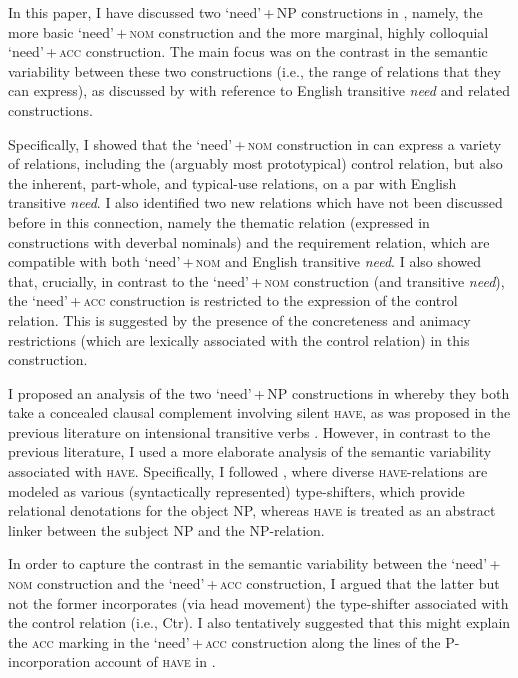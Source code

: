 \documentclass[output=paper]{langscibook}
\begin{document}
In this paper, I have discussed two `need'\,+\,NP constructions in , namely, the more basic `need'\,+\,\textsc{nom} construction and the more marginal, highly colloquial `need'\,+\,\textsc{acc} construction. The main focus was on the contrast in the semantic variability between these two constructions (i.e., the range of relations that they can express), as discussed by \citet{Zaroukian.Beller2013} with reference to English transitive \textit{need} and related constructions.

Specifically, I showed that the `need'\,+\,\textsc{nom} construction in 
can express a variety of relations, including the (arguably most prototypical) control relation, but also the inherent, part-whole, and typical-use relations, on a par with English transitive \textit{need}. I also identified two new relations which have not been discussed before in this connection, namely the thematic relation (expressed in constructions with deverbal nominals) and the requirement relation, which are compatible with both `need'\,+\,\textsc{nom} and English transitive \textit{need}. I also showed that, crucially, in contrast to the `need'\,+\,\textsc{nom} construction (and transitive \textit{need}), the `need'\,+\,\textsc{acc} construction is restricted to the expression of the control relation. This is suggested by the presence of the concreteness and animacy restrictions (which are lexically associated with the control relation) in this construction.

\begin{sloppypar}
I proposed an analysis of the two `need'\,+\,NP constructions in  whereby they both take a concealed clausal complement involving silent \textsc{have}, as was proposed in the previous literature on intensional transitive verbs \citep[e.g.,][]{Harves2008}. However, in contrast to the previous literature, I used a more elaborate analysis of the semantic variability associated with \textsc{have}. Specifically, I followed \citet{Zaroukian.Beller2013}, where diverse \textsc{have}-relations are modeled as various (syntactically represented) type-shifters, which provide relational denotations for the object NP, whereas \textsc{have} is treated as an abstract linker between the subject NP and the NP-relation.
\end{sloppypar}

In order to capture the contrast in the semantic variability between the `need'\,+ \textsc{nom} construction and the `need'\,+\,\textsc{acc} construction, I argued that the latter but not the former incorporates (via head movement) the type-shifter associated with the control relation (i.e., Ctr). I also tentatively suggested that this might explain the \textsc{acc} marking in the `need'\,+\,\textsc{acc} construction along the lines of the P-incorporation account of \textsc{have} in \citet{Freeze1992} \citep[see also][]{Kayne1993}.
\end{document}

